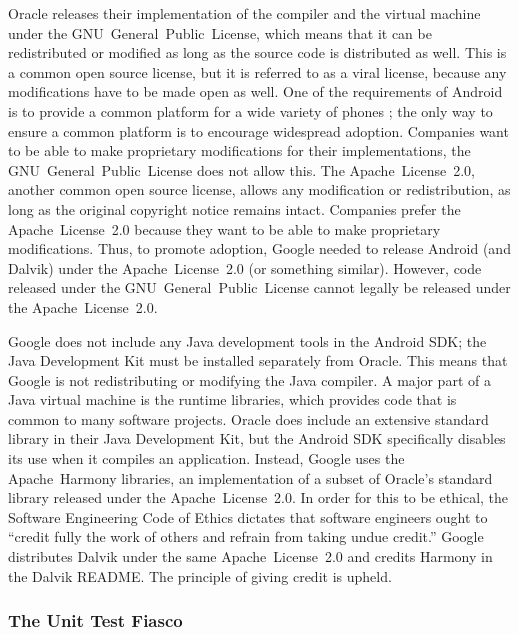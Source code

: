 \documentclass[11pt]{article}
\begin{document}
\begin{multicols}{2}
Oracle releases their implementation of the compiler and the virtual machine
under the GNU~General~Public~License, which means that it can be redistributed
or modified as long as the source code is distributed as well.  This is a common
open source license, but it is referred to as a viral license, because any
modifications have to be made open as well.  One of the requirements of Android
is to provide a common platform for a wide variety of phones
\cite{open-handset-alliance-ann}; the only way to ensure a common platform is to
encourage widespread adoption.  Companies want to be able to make proprietary
modifications for their implementations, the GNU~General~Public~License does not
allow this.  The Apache~License~2.0, another common open source license, allows
any modification or redistribution, as long as the original copyright notice
remains intact.  Companies prefer the Apache~License~2.0 because they want to be
able to make proprietary modifications.  \cite{why-apache2-license}  Thus, to
promote adoption, Google needed to release Android (and Dalvik) under the
Apache~License~2.0 (or something similar).  However, code released under the
GNU~General~Public~License cannot legally be released under the
Apache~License~2.0.

Google does not include any Java development tools in the Android SDK; the Java
Development Kit must be installed separately from Oracle.  This means that
Google is not redistributing or modifying the Java compiler.  A major part of a
Java virtual machine is the runtime libraries, which provides code that is
common to many software projects.  Oracle does include an extensive standard
library in their Java Development Kit, but the Android SDK specifically disables
its use when it compiles an application.  Instead, Google uses the
Apache~Harmony libraries, an implementation of a subset of Oracle's standard
library released under the Apache~License~2.0.  In order for this to be ethical,
the Software Engineering Code of Ethics dictates that software engineers ought
to ``credit fully the work of others and refrain from taking undue credit.''
\cite[\S 7.03]{secode}  Google distributes Dalvik under the same
Apache~License~2.0 and credits Harmony in the Dalvik README.
\cite{dalvik-readme}  The principle of giving credit is upheld.

\subsubsection{The Unit Test Fiasco} %
\label{ssub:unittest-fiasco}


\end{multicols}
\end{document}

